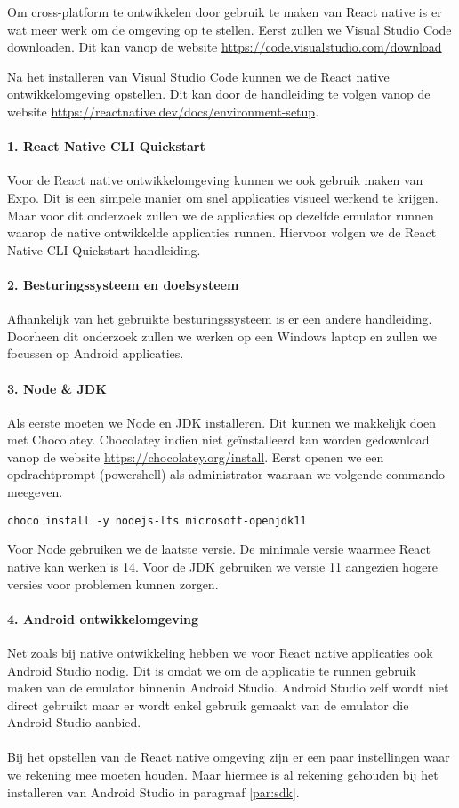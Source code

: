 Om cross-platform te ontwikkelen door gebruik te maken van React native is er wat meer werk om 
de omgeving op te stellen. Eerst zullen we Visual Studio Code downloaden. 
Dit kan vanop de website \url{https://code.visualstudio.com/download} 

Na het installeren van Visual Studio Code kunnen we de React native ontwikkelomgeving opstellen. 
Dit kan door de handleiding te volgen vanop de website \url{https://reactnative.dev/docs/environment-setup}.

\paragraph{1. React Native CLI Quickstart}
Voor de React native ontwikkelomgeving kunnen we ook gebruik maken van Expo. 
Dit is een simpele manier om snel applicaties visueel werkend te krijgen. 
Maar voor dit onderzoek zullen we de applicaties op dezelfde emulator runnen waarop de native 
ontwikkelde applicaties runnen. Hiervoor volgen we de React Native CLI Quickstart handleiding. 

\paragraph{2. Besturingssysteem en doelsysteem}
Afhankelijk van het gebruikte besturingssysteem is er een andere handleiding. 
Doorheen dit onderzoek zullen we werken op een Windows laptop en zullen we focussen op Android applicaties.

\paragraph{3. Node \& JDK}
Als eerste moeten we \gls{Node} en \gls{JDK} installeren. Dit kunnen we makkelijk 
doen met \gls{Chocolatey}. Chocolatey indien niet geïnstalleerd kan worden gedownload 
vanop de website \url{https://chocolatey.org/install}. Eerst openen we een 
opdrachtprompt (powershell) als administrator waaraan we volgende commando meegeven.
\begin{verbatim}
choco install -y nodejs-lts microsoft-openjdk11
\end{verbatim}
Voor Node gebruiken we de laatste versie. De minimale versie waarmee React native kan werken is 14. 
Voor de JDK gebruiken we versie 11 aangezien hogere versies voor problemen kunnen zorgen.

\paragraph{4. Android ontwikkelomgeving}
Net zoals bij native ontwikkeling hebben we voor React native applicaties ook Android Studio nodig. 
Dit is omdat we om de applicatie te runnen gebruik maken van de emulator binnenin Android Studio. 
Android Studio zelf wordt niet direct gebruikt maar er wordt enkel gebruik gemaakt van de 
emulator die Android Studio aanbied.
\\\\
Bij het opstellen van de React native omgeving zijn er een paar instellingen waar we rekening 
mee moeten houden. Maar hiermee is al rekening gehouden bij het installeren van Android Studio 
in paragraaf \ref{par:sdk}.

